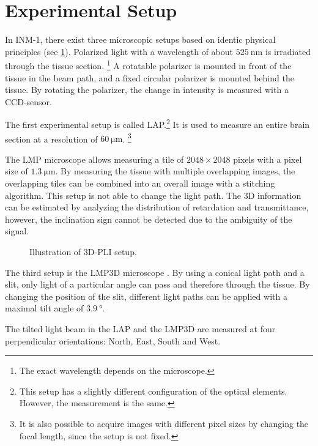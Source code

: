\section{Experimental Setup}\label{sec:expSetup}
%
In \ac{INM-1}, there exist three microscopic setups based on identic physical principles \cite{Axer2011} (see \cref{fig:pli_setup}).
Polarized light with a wavelength of about $\SI{525}{\nano\meter}$ is irradiated through the tissue section. \footnote{The exact wavelength depends on the microscope.}
A rotatable polarizer is mounted in front of the tissue in the beam path, and a fixed circular polarizer is mounted behind the tissue.
By rotating the polarizer, the change in intensity is measured with a \ac{CCD}-sensor.
\par
%
The first experimental setup is called \ac{LAP}.\footnote{This setup has a slightly different configuration of the optical elements. However, the measurement is the same.}
It is used to measure an entire brain section at a resolution of $\SI{60}{\micro\meter}$. \footnote{It is also possible to acquire images with different pixel sizes \eg{} by changing the focal length, since the setup is not fixed.}
\par
%
The \ac{LMP} microscope allows measuring a tile of $\num{2048}\times\num{2048}$ pixels with a pixel size of $\SI{1.3}{\micro\meter}$.
By measuring the tissue with multiple overlapping images, the overlapping tiles can be combined into an overall image with a stitching algorithm.
This setup is not able to change the light path.
The 3D information can be estimated by analyzing the distribution of retardation and transmittance, however, the inclination sign cannot be detected due to the ambiguity of the signal.
\par
%
\begin{figure}[!t]
    \captionsetup[sub]{position=top}
    \setlength{\tikzwidth}{\textwidth}
	\centering
	\caption[]{Illustration of \acs{3D-PLI} setup.}
	\label{fig:pli_setup}
\end{figure}
%
The third setup is the \ac{LMP3D} microscope \cite{Wiese:887678}.
By using a conical light path and a slit, only light of a particular angle can pass and therefore through the tissue.
By changing the position of the slit, different light paths can be applied with a maximal tilt angle of $\SI{3.9}{\degree}$.
\par
%
The tilted light beam in the \acs{LAP} and the \acs{LMP3D} are measured at four perpendicular orientations: North, East, South and West.
\par
